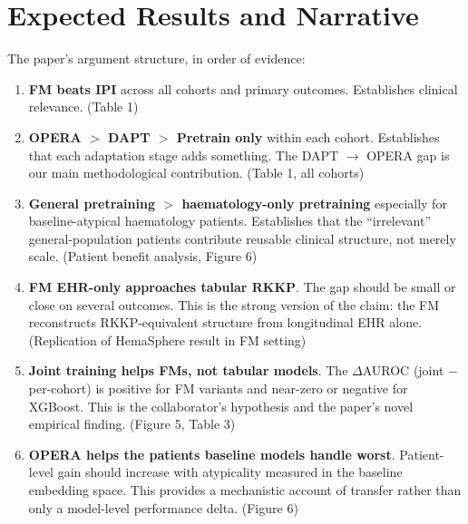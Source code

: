\documentclass[11pt, a4paper]{article}
\begin{document}
\section{Expected Results and Narrative}

The paper's argument structure, in order of evidence:

\begin{enumerate}[leftmargin=2em, itemsep=6pt]

  \item \textbf{FM beats IPI} across all cohorts and primary outcomes.
        Establishes clinical relevance. (Table 1)

  \item \textbf{OPERA $>$ DAPT $>$ Pretrain only} within each cohort.
        Establishes that each adaptation stage adds something.
        The DAPT $\to$ OPERA gap is our main methodological contribution.
        (Table 1, all cohorts)

  \item \textbf{General pretraining $>$ haematology-only pretraining}
        especially for baseline-atypical haematology patients.
        Establishes that the ``irrelevant'' general-population patients
        contribute reusable clinical structure, not merely scale.
        (Patient benefit analysis, Figure 6)

  \item \textbf{FM EHR-only approaches tabular RKKP}.
        The gap should be small or close on several outcomes.
        This is the strong version of the claim: the FM reconstructs
        RKKP-equivalent structure from longitudinal EHR alone.
        (Replication of HemaSphere result in FM setting)

  \item \textbf{Joint training helps FMs, not tabular models}.
        The $\Delta$AUROC (joint $-$ per-cohort) is positive for FM
        variants and near-zero or negative for XGBoost.
        This is the collaborator's hypothesis and the paper's novel
        empirical finding. (Figure 5, Table 3)

  \item \textbf{OPERA helps the patients baseline models handle worst}.
        Patient-level gain should increase with atypicality measured in
        the baseline embedding space. This provides a mechanistic account
        of transfer rather than only a model-level performance delta.
        (Figure 6)


\end{enumerate}
\end{document}
